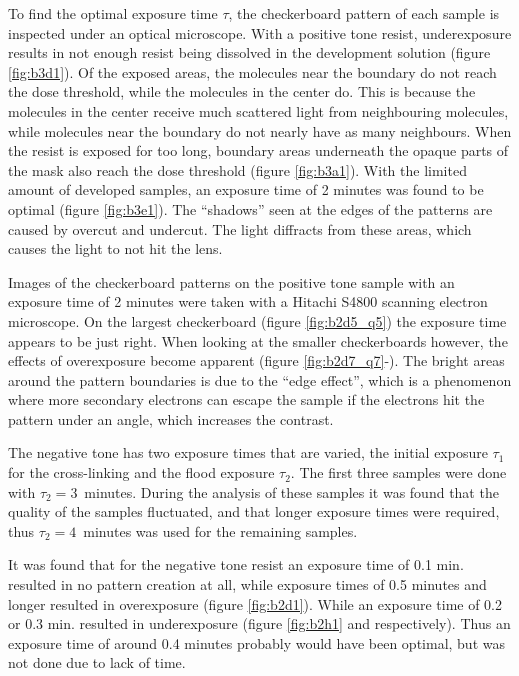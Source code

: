 To find the optimal exposure time $\tau$, the checkerboard pattern of each sample is inspected under an optical microscope. With a positive tone resist, underexposure results in not enough resist being dissolved in the development solution (figure \ref{fig:b3d1}). Of the exposed areas, the molecules near the boundary do not reach the dose threshold, while the molecules in the center do. This is because the molecules in the center receive much scattered light from neighbouring molecules, while molecules near the boundary do not nearly have as many neighbours. When the resist is exposed for too long, boundary areas underneath the opaque parts of the mask also reach the dose threshold (figure \ref{fig:b3a1}). With the limited amount of developed samples, an exposure time of 2 minutes was found to be optimal (figure \ref{fig:b3e1}). The ``shadows'' seen at the edges of the patterns are caused by overcut and undercut. The light diffracts from these areas, which causes the light to not hit the lens.

Images of the checkerboard patterns on the positive tone sample with an exposure time of 2 minutes were taken with a Hitachi S4800 scanning electron microscope. On the largest checkerboard (figure \ref{fig:b2d5_q5}) the exposure time appears to be just right. When looking at the smaller checkerboards however, the effects of overexposure become apparent (figure \ref{fig:b2d7_q7}-). The bright areas around the pattern boundaries is due to the ``edge effect'', which is a phenomenon where more secondary electrons can escape the sample if the electrons hit the pattern under an angle, which increases the contrast.

The negative tone has two exposure times that are varied, the initial exposure $\tau_1$ for the cross-linking and the flood exposure $\tau_2$. The first three samples were done with $\tau_2 = 3$~minutes. During the analysis of these samples it was found that the quality of the samples fluctuated, and that longer exposure times were required, thus $\tau_2 = 4$~minutes was used for the remaining samples. 

It was found that for the negative tone resist an exposure time of 0.1 min. resulted in no pattern creation at all, while exposure times of 0.5 minutes and longer resulted in overexposure (figure \ref{fig:b2d1}). While an exposure time of 0.2 or 0.3 min. resulted in underexposure (figure \ref{fig:b2h1} and  respectively). Thus an exposure time of around 0.4 minutes probably would have been optimal, but was not done due to lack of time. 

